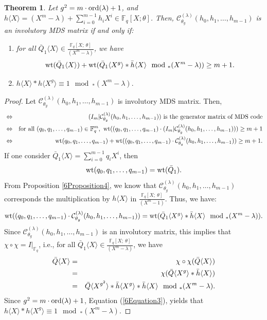 \documentclass[12pt]{article}
\newtheorem{theorem}{Theorem}
\begin{document}
\begin{theorem}\label{6Theorem2}
	Let $g^2=m \cdot \textup{ord}(\lambda)+1$, and $h\langle X \rangle=(X^m-\lambda)+\sum_{i=0}^{m-1}h_iX^i\in \mathbb{F}_q[X;\theta]$. Then, $\mathcal{C}_{\theta_g}^{(\lambda)}(h_0, h_1, \ldots, h_{m-1})$ is an involutory MDS matrix if and only if:
	\begin{enumerate}
		\item [(i)] for all $\bar{Q}_1\langle X \rangle\in \frac{\mathbb{F}_q[X;~\theta]}{(X^m-\lambda)}$, we have 
		$$\textup{wt}(\bar{Q}_1\langle X \rangle)+\textup{wt}(\bar{Q}_1\langle X^g\rangle\ast \bar{h}\langle X \rangle \mod_\ast (X^m-\lambda))\geq m+1.$$
		\item [(ii)] $h\langle X \rangle\ast h\langle X^g\rangle \equiv 1 \mod_\ast (X^m-\lambda).$
	\end{enumerate} 
\end{theorem}
\begin{proof}
	Let $\mathcal{C}_{\theta_g}^{(\lambda)}(h_0, h_1, \ldots, h_{m-1})$ is involutory MDS matrix. Then,  
	\begin{eqnarray*}
		&\Leftrightarrow& (I_m|\mathcal{C}_{\theta_g}^{(\lambda)}(h_0, h_1, \ldots, h_{m-1}))~\textup{is the generator matrix of MDS code}\\
		&\Leftrightarrow& \textup{for all } (q_0,q_1,\dots,q_{m-1})\in \mathbb{F}^m_{q},~\textup{wt}((q_0,q_1,\dots,q_{m-1})\cdot(I_m|\mathcal{C}_{\theta_g}^{(\lambda)}(h_0, h_1, \ldots, h_{m-1})))\geq m+1\\
		&\Leftrightarrow& \textup{wt}(q_0,q_1,\dots,q_{m-1})+\textup{wt}((q_0,q_1,\dots,q_{m-1})\cdot \mathcal{C}_{\theta_g}^{(\lambda)}(h_0, h_1, \ldots, h_{m-1}))\geq m+1.
	\end{eqnarray*}
	If one consider $\bar{Q}_1\langle  X\rangle=\sum_{i=0}^{m-1}q_iX^i$, then 
	$$\textup{wt}(q_0,q_1,\dots,q_{m-1})=\textup{wt}(\bar{Q}_1).$$
	From Proposition \ref{6Proposition4}, we know that $\mathcal{C}_{\theta_g}^{(\lambda)}(h_0, h_1, \ldots, h_{m-1})$ corresponds the multiplication by \( h \langle X \rangle \) in \( \frac{\mathbb{F}_{q}[X;~ \theta]}{(X^m - 1)} \). Thus, we have:
	$$\textup{wt}((q_0,q_1,\dots,q_{m-1})\cdot \mathcal{C}_{\theta_g}^{(\lambda)}(h_0, h_1, \ldots, h_{m-1}))=\textup{wt}(\bar{Q}_1\langle X^g\rangle\ast \bar{h}\langle X \rangle \mod_\ast  (X^m-\lambda)).$$
	Since $\mathcal{C}_{\theta_g}^{(\lambda)}(h_0, h_1, \ldots, h_{m-1})$ is an involutory matrix, this implies that $\chi \circ \chi =I|_{\mathbb{F}_q}$, i.e., for all $\bar{Q}_1\langle X \rangle\in \frac{\mathbb{F}_q[X;~\theta]}{(X^m-\lambda)}$, we have
	\begin{eqnarray}\label{6Equation3}
		\bar{Q}\langle X \rangle\notag&=&\chi\circ\chi(\bar{Q}\langle X \rangle)\\
		\notag&=&\chi(\bar{Q}\langle X^g\rangle\ast \bar{h}\langle X \rangle)\\
		&=&\bar{Q}\langle X^{g^2}\rangle\ast \bar{h}\langle X^g\rangle \ast \bar{h}\langle X \rangle \mod_\ast (X^m-\lambda).
	\end{eqnarray}
	Since $g^2=m \cdot \textup{ord}(\lambda)+1$, 	Equation (\ref{6Equation3}), yields that   $h\langle X \rangle \ast h\langle X^g\rangle\equiv 1 \mod_\ast (X^m-\lambda).$ 
\end{proof}
\end{document}
